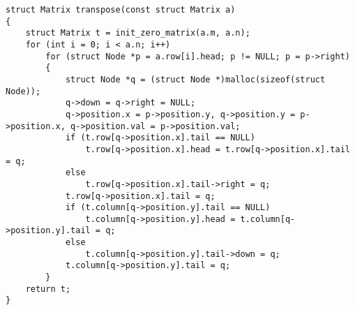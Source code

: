 \documentclass[12pt]{article}
\begin{document}
{\begin{lstlisting}
struct Matrix transpose(const struct Matrix a)
{
    struct Matrix t = init_zero_matrix(a.m, a.n);
    for (int i = 0; i < a.n; i++)
        for (struct Node *p = a.row[i].head; p != NULL; p = p->right)
        {
            struct Node *q = (struct Node *)malloc(sizeof(struct Node));
            q->down = q->right = NULL;
            q->position.x = p->position.y, q->position.y = p->position.x, q->position.val = p->position.val;
            if (t.row[q->position.x].tail == NULL)
                t.row[q->position.x].head = t.row[q->position.x].tail = q;
            else
                t.row[q->position.x].tail->right = q;
            t.row[q->position.x].tail = q;
            if (t.column[q->position.y].tail == NULL)
                t.column[q->position.y].head = t.column[q->position.y].tail = q;
            else
                t.column[q->position.y].tail->down = q;
            t.column[q->position.y].tail = q;
        }
    return t;
}
\end{lstlisting}
}
\end{document}
